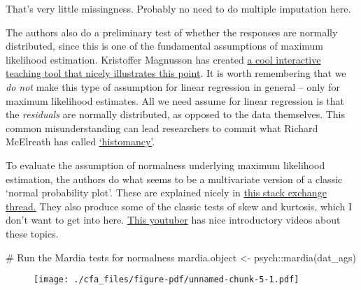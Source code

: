 \documentclass[
  letterpaper,
  DIV=11,
  numbers=noendperiod]{scrreprt}
\newenvironment{Shaded}{\begin{snugshade}}{\end{snugshade}}
\newcommand{\CommentTok}[1]{\textcolor[rgb]{0.37,0.37,0.37}{#1}}
\newcommand{\FunctionTok}[1]{\textcolor[rgb]{0.28,0.35,0.67}{#1}}
\newcommand{\NormalTok}[1]{\textcolor[rgb]{0.00,0.23,0.31}{#1}}
\newcommand{\OtherTok}[1]{\textcolor[rgb]{0.00,0.23,0.31}{#1}}
\newcommand{\SpecialCharTok}[1]{\textcolor[rgb]{0.37,0.37,0.37}{#1}}
\begin{document}
That's very little missingness. Probably no need to do multiple
imputation here.

The authors also do a preliminary test of whether the responses are
normally distributed, since this is one of the fundamental assumptions
of maximum likelihood estimation. Kristoffer Magnusson has created
\href{https://rpsychologist.com/likelihood/}{a cool interactive teaching
tool that nicely illustrates this point}. It is worth remembering that
we \emph{do not} make this type of assumption for linear regression in
general -- only for maximum likelihood estimates. All we need assume for
linear regression is that the \emph{residuals} are normally distributed,
as opposed to the data themselves. This common misunderstanding can lead
researchers to commit what Richard McElreath has called
\href{https://stats.stackexchange.com/questions/515444/histomancy-what-does-mcelreath-propose-we-do-instead}{`histomancy'}.

To evaluate the assumption of normalness underlying maximum likelihood
estimation, the authors do what seems to be a multivariate version of a
classic `normal probability plot'. These are explained nicely in
\href{https://stats.stackexchange.com/questions/218638/understanding-normal-probability-plots}{this
stack exchange thread.} They also produce some of the classic tests of
skew and kurtosis, which I don't want to get into here.
\href{https://www.youtube.com/watch?v=TM033GCU-SY\&t=26s}{This youtuber}
has nice introductory videos about these topics.

\begin{Shaded}
\begin{Highlighting}[]
\CommentTok{\# Run the Mardia tests for normalness}
\NormalTok{mardia.object }\OtherTok{\textless{}{-}}\NormalTok{ psych}\SpecialCharTok{::}\FunctionTok{mardia}\NormalTok{(dat\_ags)}
\end{Highlighting}
\end{Shaded}

\begin{figure}[H]

{\centering \texttt{[image: ./cfa\_files/figure-pdf/unnamed-chunk-5-1.pdf]}

}

\end{figure}
\end{document}
